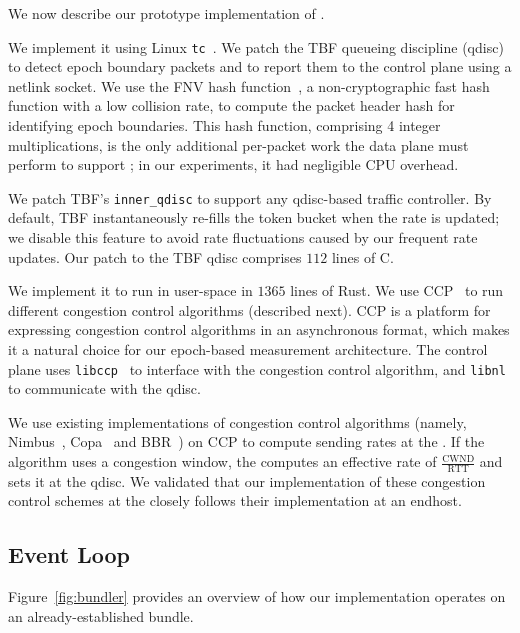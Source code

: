 We now describe our prototype implementation of \name.

 We implement it using Linux \texttt{tc}~\cite{tc}.
We patch the TBF queueing discipline (qdisc)~\cite{tbf} to detect epoch boundary packets and to report them to the control plane using a netlink socket. 
We use the FNV hash function~\cite{fnv-hash}, a non-cryptographic fast hash function with a low collision rate, to compute the packet header hash for identifying epoch boundaries.
This hash function, comprising 4 integer multiplications, is the only additional per-packet work the data plane must perform to support \name; in our experiments, it had negligible CPU overhead.

We patch TBF's \texttt{inner\_qdisc} to support any qdisc-based traffic controller.
By default, TBF instantaneously re-fills the token bucket when the rate is updated; we disable this feature to avoid rate fluctuations caused by our frequent rate updates. 
Our patch to the TBF qdisc comprises $112$ lines of C.

 We implement it to run in user-space in $1365$ lines of Rust.
We use CCP~\cite{ccp} to run different congestion control algorithms (described next). 
CCP is a platform for expressing congestion control algorithms in an asynchronous format, which makes it a natural choice for our epoch-based measurement architecture. 
The control plane uses \texttt{libccp}~\cite{ccp} to interface with the congestion control algorithm, and  \texttt{libnl} to communicate with the qdisc.

 We use existing implementations of congestion control algorithms (namely, Nimbus~\cite{nimbus-arxiv}, Copa~\cite{copa} and BBR~\cite{bbr}) on CCP to compute sending rates at the \inbox.  If the algorithm uses a congestion window, the \inbox computes an effective rate of $\frac{\text{CWND}}{\text{RTT}}$ and sets it at the qdisc. 
We validated that our implementation of these congestion control schemes at the \inbox closely follows their implementation at an endhost.


\subsection{\name Event Loop}\label{s:impl:loop}
Figure~\ref{fig:bundler} provides an overview of how our \name implementation operates on an already-established bundle. 

